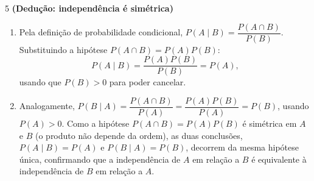 \documentclass[11pt]{article}
\begin{document}
\begin{questao}{5} \textbf{(Dedução: independência é simétrica)}
\begin{solucao}
\begin{enumerate}[label=(\alph*)]
  \item Pela definição de probabilidade condicional, $P(A\mid B) = \dfrac{P(A\cap B)}{P(B)}$.
    Substituindo a hipótese $P(A\cap B)=P(A)P(B)$:
    $$
    P(A\mid B) = \frac{P(A)P(B)}{P(B)} = P(A),
    $$
    usando que $P(B)>0$ para poder cancelar.
  \item Analogamente, $P(B\mid A) = \dfrac{P(A\cap B)}{P(A)} = \dfrac{P(A)P(B)}{P(A)} = P(B)$,
    usando $P(A)>0$. Como a hipótese $P(A\cap B)=P(A)P(B)$ é simétrica em $A$ e $B$ (o produto não
    depende da ordem), as duas conclusões, $P(A\mid B)=P(A)$ e $P(B\mid A)=P(B)$, decorrem da
    mesma hipótese única, confirmando que a independência de $A$ em relação a $B$ é equivalente à
    independência de $B$ em relação a $A$.
\end{enumerate}
\end{solucao}
\end{questao}
\end{document}
